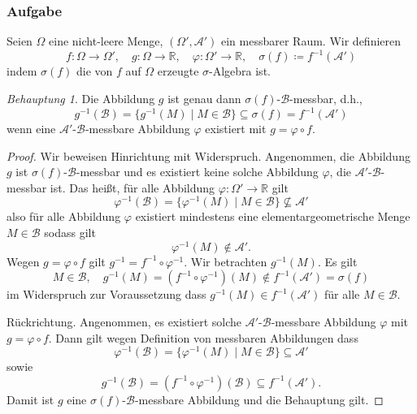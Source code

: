 \documentclass[fleqn,draft,a5paper]{article}
\theoremstyle{remark}
\newtheorem*{Behauptung}{Behauptung}
\begin{document}
\subsubsection{Aufgabe}
  Seien \(\Omega\) eine nicht-leere Menge, \((\Omega', \mathcal{A}')\) ein messbarer Raum.
  Wir definieren
  \[f\colon \Omega \to \Omega', \quad g\colon \Omega \to \mathbb{R}, \quad \varphi\colon \Omega' \to \mathbb{R}, \quad \sigma(f) \coloneq f^{-1}(\mathcal{A}')\] indem
  \(\sigma(f)\) die von \(f\) auf \(\Omega\) erzeugte \(\sigma\)-Algebra ist.
\begin{Behauptung}
  Die Abbildung \(g\) ist genau dann \(\sigma(f)\)-\(\mathcal{B}\)-messbar, d.h.,
  \[g^{-1}(\mathcal{B}) = \{g^{-1}(M) \mid M \in \mathcal{B}\} \subseteq \sigma(f) = f^{-1}(\mathcal{A}')\] wenn eine
  \(\mathcal{A}'\)-\(\mathcal{B}\)-messbare Abbildung \(\varphi\) existiert mit \(g = \varphi \circ f\).
\end{Behauptung}
\begin{proof}
  Wir beweisen Hinrichtung mit Widerspruch.  Angenommen, die Abbildung
  \(g\) ist \(\sigma(f)\)-\(\mathcal{B}\)-messbar und es existiert keine solche Abbildung
  \(\varphi\), die \(\mathcal{A}'\)-\(\mathcal{B}\)-messbar ist.  Das heißt, für alle Abbildung
  \(\varphi\colon \Omega' \to \mathbb{R}\) gilt
  \[\varphi^{-1}(\mathcal{B}) = \{\varphi^{-1}(M) \mid M \in \mathcal{B}\} \nsubseteq \mathcal{A}'\]
  also für alle Abbildung \(\varphi\) existiert mindestens eine
  elementargeometrische Menge \(M \in \mathcal{B}\) sodass gilt
  \[\varphi^{-1}(M) \notin \mathcal{A}'.\]
  Wegen \(g = \varphi \circ f\) gilt \(g^{-1} = f^{-1} \circ \varphi^{-1}\).  Wir betrachten
  \(g^{-1}(M)\).  Es gilt
  \[M \in \mathcal{B}, \quad g^{-1}(M) = (f^{-1} \circ \varphi^{-1})(M) \notin f^{-1}(\mathcal{A}') = \sigma(f)\]
  im Widerspruch zur Voraussetzung dass \(g^{-1}(M) \in f^{-1}(\mathcal{A}')\) für alle \(M \in
  \mathcal{B}\).

  Rückrichtung.  Angenommen, es existiert solche \(\mathcal{A}'\)-\(\mathcal{B}\)-messbare
  Abbildung \(\varphi\) mit \(g = \varphi \circ f\).  Dann gilt wegen Definition von
  messbaren Abbildungen dass
  \[\varphi^{-1}(\mathcal{B}) = \{\varphi^{-1}(M) \mid M \in \mathcal{B}\} \subseteq \mathcal{A}'\]
  sowie
  \[g^{-1}(\mathcal{B}) = (f^{-1} \circ \varphi^{-1})(\mathcal{B}) \subseteq f^{-1}(\mathcal{A}').\]
  Damit ist \(g\)  eine \(\sigma(f)\)-\(\mathcal{B}\)-messbare Abbildung und die Behauptung
  gilt.
\end{proof}
\end{document}
